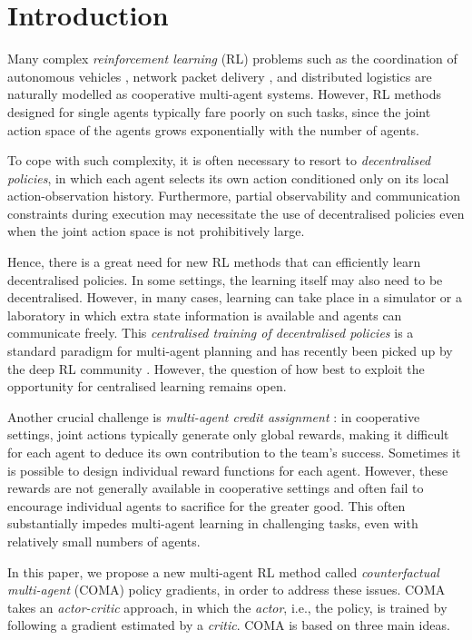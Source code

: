 \documentclass[letterpaper]{article}
\newcommand{\citep}{\cite}
\begin{document}
\section{Introduction}
\label{sec:intro}

Many complex \emph{reinforcement learning} (RL) problems such as the coordination of autonomous vehicles \citep{cao2013overview}, network packet delivery \citep{ye2015multi}, and distributed logistics \citep{ying2005multi} are naturally modelled as cooperative multi-agent systems.  However, RL methods designed for single agents typically fare poorly on such tasks, since the joint action space of the agents grows exponentially with the number of agents.  

To cope with such complexity, it is often necessary to resort to \emph{decentralised policies}, in which each agent selects its own action conditioned only on its local action-observation history.  Furthermore, partial observability and communication constraints during execution may necessitate the use of decentralised policies even when the joint action space is not prohibitively large.

Hence, there is a great need for new RL methods that can efficiently learn decentralised policies.  In some settings, the learning itself may also need to be decentralised.  However, in many cases, learning can take place in a simulator or a laboratory in which extra state information is available and agents can communicate freely.  This \emph{centralised training of decentralised policies} is a standard paradigm for multi-agent planning \citep{Oliehoek08JAIR,kraemer2016multi} and has recently been picked up by the deep RL community \citep{foerster2016learning,jorge2016learning}.  However, the question of how best to exploit the opportunity for centralised learning remains open.

Another crucial challenge is \emph{multi-agent credit assignment} 
\citep{chang2003all}: in cooperative settings, joint actions typically generate 
only global rewards, making it difficult for each agent to deduce its own 
contribution to the team's success.  Sometimes it is possible to design 
individual reward functions for each agent.  However, these rewards are not 
generally available in cooperative settings and often fail to encourage 
individual agents to sacrifice for the greater good. This often substantially 
impedes multi-agent learning in challenging tasks, even with relatively small 
numbers of agents.

In this paper, we propose a new multi-agent RL method called 
\emph{counterfactual multi-agent} (COMA) policy gradients, in order to address 
these issues.  COMA takes an \emph{actor-critic} \citep{konda2000actor} 
approach, in which the \emph{actor}, i.e., the policy, is trained by following 
a gradient estimated by a \emph{critic}.
COMA is based on three main ideas.  
\end{document}
